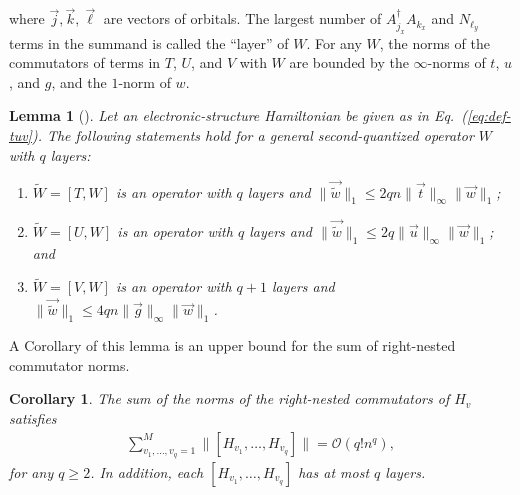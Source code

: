 \documentclass[11pt]{article}
\newtheorem{lemma}{Lemma}
\newtheorem{corollary}{Corollary}
\newcommand{\eq}[1]{(\ref{eq:#1})}
\begin{document}
where $\vec{j}, \vec{k},\vec{\ell}$ are vectors of orbitals. The largest number of $A_{j_x}^{\dagger} A_{k_x}$ and $N_{\ell_y}$ terms in the summand is called the ``layer'' of $W$. For any $W$, the norms of the commutators of terms in $T$, $U$, and $V$ with $W$ are bounded by the $\infty$-norms of $t$, $u$, and $g$, and the $1$-norm of $w$.
\begin{lemma}[{\cite[Proposition F.4]{childs2021theory}}]
\label{lem:recursion-W}
     Let an electronic-structure Hamiltonian be given as in Eq.~\eq{def-tuv}. The following statements hold for a general second-quantized operator $W$ with $q$ layers:
     \begin{enumerate}
         \item $\tilde{W}=[T, W]$ is an operator with $q$ layers and $\|\vec{\tilde{w}}\|_1 \leq 2 q n\|\vec{t}\|_{\infty}\|\vec{w}\|_1 $;
         \item $\tilde{W}=[U, W]$ is an operator with $q$ layers and $\|\vec{\tilde{w}}\|_1 \leq 2 q\|\vec{u}\|_{\infty}\|\vec{w}\|_1$; and 
         \item $\tilde{W}=[V, W]$ is an operator with $q+1$ layers and $\|\vec{\tilde{w}}\|_1 \leq 4 q n\|\vec{g}\|_{\infty}\|\vec{w}\|_1$.
     \end{enumerate}
\end{lemma}
A Corollary of this lemma is an upper bound for the sum of right-nested commutator norms. 
\begin{corollary}
\label{cor:right-comm-second}
    The sum of the norms of the right-nested commutators of $H_v$ satisfies 
    \begin{align*}
        \sum_{v_1, \ldots, v_q=1}^{M} \|[H_{v_1}, \ldots, H_{v_q}]\| = \mathcal{O}(q! n^q),
    \end{align*}
    for any $q\ge 2$. In addition, each $[H_{v_1}, \ldots, H_{v_q}]$ has at most $q$ layers. 
\end{corollary}
\end{document}
